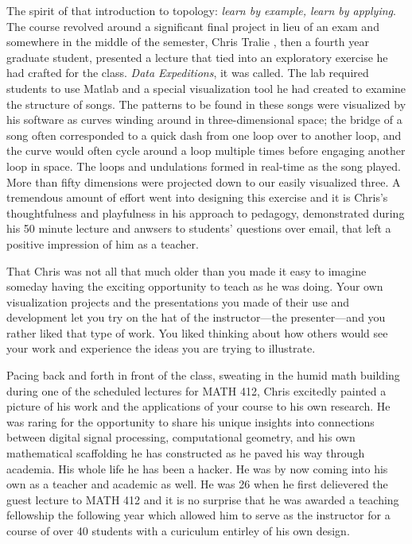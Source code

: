 \documentclass[../main.tex]{subfiles}
\begin{document}
The spirit of that introduction to topology: \textit{learn by example, learn by applying}. The course revolved around a significant final project in lieu of an exam and somewhere in the middle of the semester, Chris Tralie , then a fourth year graduate student, presented a lecture that tied into an exploratory exercise he had crafted for the class. \textit{Data Expeditions}, it was called. The lab required students to use Matlab and a special visualization tool he had created to examine the structure of songs. The patterns to be found in these songs were visualized by his software as curves winding around in three-dimensional space; the bridge of a song often corresponded to a quick dash from one loop over to another loop, and the curve would often cycle around a loop multiple times before engaging another loop in space. The loops and undulations formed in real-time as the song played. More than fifty dimensions were projected down to our easily visualized three. A tremendous amount of effort went into designing this exercise and it is Chris's thoughtfulness and playfulness in his approach to pedagogy, demonstrated during his 50 minute lecture and anwsers to students' questions over email, that left a positive impression of him as a teacher.

That Chris was not all that much older than you made it easy to imagine someday having the exciting opportunity to teach as he was doing. Your own visualization projects and the presentations you made of their use and development let you try on the hat of the instructor---the presenter---and you rather liked that type of work. You liked thinking about how others would see your work and experience the ideas you are trying to illustrate.

 Pacing back and forth in front of the class, sweating in the humid math building during one of the scheduled lectures for MATH 412, Chris excitedly painted a picture of his work and the applications of your course to his own research. He was raring for the opportunity to share his unique insights into connections between digital signal processing, computational geometry, and his own mathematical scaffolding he has constructed as he paved his way through academia. His whole life he has been a hacker. He was by now coming into his own as a teacher and academic as well. He was 26 when he first delievered the guest lecture to MATH 412 and it is no surprise that he was awarded a teaching fellowship the following year which allowed him to serve as the instructor for a course of over 40 students with a curiculum entirley of his own design.
 
\end{document}
